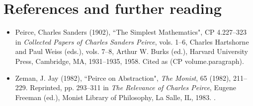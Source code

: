 \documentclass[12pt]{article}
\begin{document}
\section{References and further reading}

\begin{itemize}
\item
Peirce, Charles Sanders (1902), ``The Simplest Mathematics", CP 4.227--323 in \textit{Collected Papers of Charles Sanders Peirce}, vols. 1--6, Charles Hartshorne and Paul Weiss (eds.), vols. 7--8, Arthur W. Burks (ed.), Harvard University Press, Cambridge, MA, 1931--1935, 1958.  Cited as (CP volume.paragraph).
\item
Zeman, J. Jay (1982), ``Peirce on Abstraction", \textit{The Monist}, 65 (1982), 211--229.  Reprinted, pp. 293--311 in \textit{The Relevance of Charles Peirce}, Eugene Freeman (ed.), Monist Library of Philosophy, La Salle, IL, 1983.  .
\end{itemize}

\end{document}

